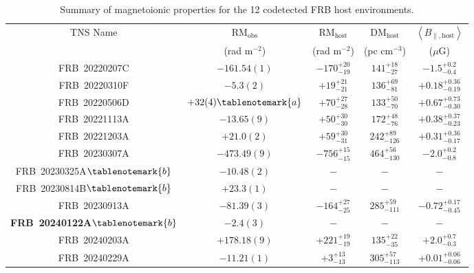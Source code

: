 \documentclass[twocolumn, linenumbers]{aastex701}
\newcommand{\newchange}[1]{{\color{red}\textbf{#1}}}
\begin{document}
\setlength{\tabcolsep}{0.08pt}
\setlength\extrarowheight{2pt}
\setlength{\LTcapwidth}{1.0\textwidth}
\begin{table}[ht!]
\begin{center}
\caption{Summary of magnetoionic properties for the 12 codetected FRB host environments.} \label{tb:host_props}
\begin{tabular}{ccccc}
\hline
\hline
TNS Name & $\mathrm{RM}_\mathrm{obs}$ & $\mathrm{RM}_\mathrm{host}$ & $\mathrm{DM}_\mathrm{host}$ & $\left<B_{\parallel,\mathrm{host}}\right>$\\
 & (rad m$^{-2}$) & (rad m$^{-2}$) & (pc cm$^{-3}$) & ($\mu$G)\\
\hline
FRB~20220207C & $-161.54(1)$ & $-170^{+20}_{-19}$ & $141^{+18}_{-27}$ & $-1.5^{+0.2}_{-0.4}$\\
FRB~20220310F & $-5.3(2)$ & $+19^{+21}_{-21}$ & $136^{+69}_{-81}$ & $+0.18^{+0.36}_{-0.19}$\\
FRB~20220506D & $+32(4)\tablenotemark{a}$ & $+70^{+27}_{-28}$ & $133^{+50}_{-70}$ & $+0.67^{+0.73}_{-0.30}$\\
FRB~20221113A & $-13.65(9)$ & $+50^{+30}_{-30}$ & $172^{+48}_{-76}$ & $+0.38^{+0.37}_{-0.23}$\\
FRB~20221203A & $+21.0(2)$ & $+59^{+30}_{-31}$ & $242^{+89}_{-126}$ & $+0.31^{+0.36}_{-0.17}$\\
FRB~20230307A & $-473.49(9)$ & $-756^{+15}_{-15}$ & $464^{+56}_{-130}$ & $-2.0^{+0.2}_{-0.8}$\\
FRB~20230325A$\tablenotemark{b}$ & $-10.48(2)$ & $-$ & $-$  & $-$\\
FRB~20230814B$\tablenotemark{b}$ & $+23.3(1)$ & $-$ & $-$ & $-$\\
FRB~20230913A & $-81.39(3)$ & $-164^{+27}_{-25}$ & $285^{+59}_{-111}$ & $-0.72^{+0.17}_{-0.45}$\\
\newchange{FRB~20240122A}$\tablenotemark{b}$ & $-2.4(3)$ & $-$ & $-$ & $-$\\
FRB~20240203A & $+178.18(9)$ & $+221^{+19}_{-19}$ & $135^{+22}_{-35}$ & $+2.0^{+0.7}_{-0.3}$\\
FRB~20240229A & $-11.21(1)$ & $+3^{+13}_{-13}$ & $305^{+57}_{-113}$ & $+0.01^{+0.06}_{-0.06}$\\
\hline
\hline
\end{tabular}
\end{center}
\end{table}
\end{document}
